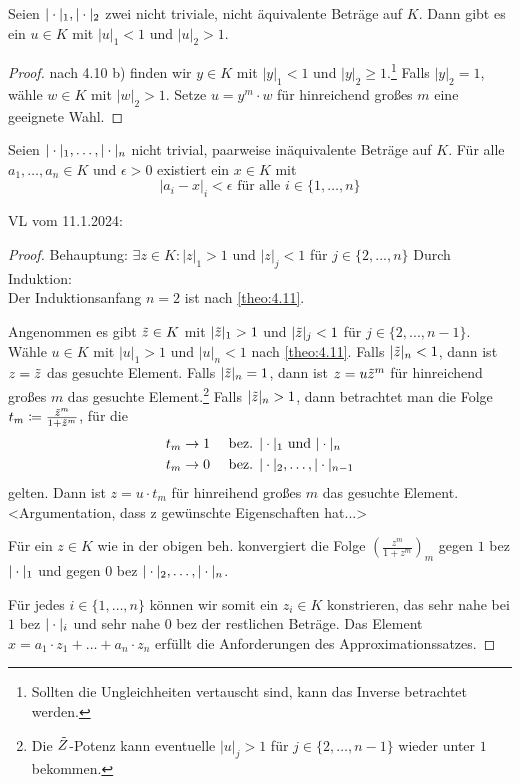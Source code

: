 \documentclass[../main.tex]{subfiles}
\begin{document}
\begin{corollary}\label{theo:4.11}
    Seien $|\cdot|_1,|\cdot|_2$ zwei nicht triviale, nicht äquivalente Beträge auf $K$. Dann gibt es ein $u\in K$ mit $|u|_1 < 1$ und $|u|_2 > 1$.
\end{corollary}
\begin{proof}
    nach 4.10 b) finden wir $y\in K$ mit $|y|_1 <1$ und $|y|_2\geq 1$.\footnote{Sollten die Ungleichheiten vertauscht sind, kann das Inverse betrachtet werden.}
     Falls $|y|_2 = 1$, wähle $w\in K$ mit $|w|_2>1$.
     Setze $u=y^m\cdot w$ für hinreichend großes $m$ eine geeignete Wahl.
\end{proof}

\begin{theorem}[Approximationssatz]
    Seien $|\cdot|_1, \dots,|\cdot|_n$ nicht trivial, paarweise inäquivalente Beträge auf $K$.
    Für alle $a_1,\dots, a_n\in K$ und $\epsilon > 0$ existiert ein $x\in K$ mit $$|a_i-x|_i <\epsilon \text{ für alle } i\in \{1,\dots,n\}$$
\end{theorem}

\begin{flushright}
VL vom 11.1.2024:
\end{flushright}

\begin{proof}
    Behauptung: $\exists z\in K: |z|_1 > 1$ und $|z|_j<1$ für $j\in \{2,...,n\}$
    Durch Induktion: \\
    Der Induktionsanfang $n=2$ ist nach \ref{theo:4.11}\checkmark.

    Angenommen es gibt $\Tilde{z}\in K$ mit $|\Tilde{z}|_1 > 1$ und $|\Tilde{z}|_j <1$ für $j\in \{2,...,n-1\}$.
    Wähle $u\in K$ mit $|u|_1>1$ und $|u|_n<1$ nach \ref{theo:4.11}.
    Falls $|\Tilde{z}|_n<1$, dann ist $z=\Tilde{z}$ das gesuchte Element.
    Falls $|\Tilde{z}|_n = 1$, dann ist $z=u\Tilde{z}^m$ für hinreichend großes $m$ das gesuchte Element.\footnote{Die $\Tilde{Z}$-Potenz kann eventuelle $|u|_j>1$ für $j\in\{2,\dots,n-1\}$ wieder unter $1$ bekommen.}
    Falls $|\Tilde{z}|_n > 1$, dann betrachtet man die Folge $t_m\coloneqq \frac{\Tilde{z}^m}{1+\Tilde{z}^m}$, für die
    \begin{align*}
        t_m\rightarrow 1\quad &\text{ bez. }|\cdot|_1\text{ und }|\cdot|_n\\
        t_m\rightarrow 0\quad&\text{ bez. }|\cdot|_2,\dots,|\cdot|_{n-1}
    \end{align*}
    gelten.
    Dann ist $z=u\cdot t_m$ für hinreihend großes $m$ das gesuchte Element.
    <Argumentation, dass z gewünschte Eigenschaften hat...>

    Für ein $z\in K$ wie in der obigen beh. konvergiert die Folge $(\frac{z^m}{1+z^m})_m$ gegen $1$ bez $|\cdot|_1$ und gegen $0$ bez $|\cdot|_2,\dots,|\cdot|_n$.

    Für jedes $i\in \{1,\dots,n\}$ können wir somit ein $z_i\in K$ konstrieren, das sehr nahe bei $1$ bez $|\cdot|_i$ und sehr nahe $0$ bez der restlichen Beträge.
    Das Element $x=a_1\cdot z_1 + \dots +a_n\cdot z_n$ erfüllt die Anforderungen des Approximationssatzes. 
\end{proof}
\end{document}
